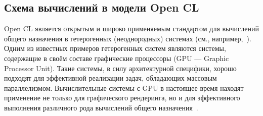 

\subsection*{Схема вычислений в модели Open CL}
\label{sec:OCLprog}




Open CL является открытым и широко применяемым стандартом для вычислений
общего назначения в 
гетерогенных (неоднородных) системах
(см., например,~\cite{paper_heterog_NIISI, paper_OCL_Komdiv, paper_Deg_Bogd}). 
Одним из известных примеров гетерогенных систем являются системы,
содержащие в своём составе графические процессоры (GPU --- Graphic Processor Unit).
Такие системы, в силу архитектурной специфики,   
хорошо подходят для эффективной реализации задач,
обладающих массовым параллелизмом.
Вычислительные системы с GPU в настоящее время находят применение не только для
графического рендеринга, но и для %
эффективного выполнения различного рода
вычислений общего назначения~\cite{}. 



